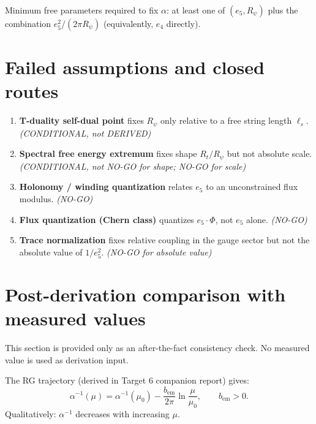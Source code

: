 \documentclass[11pt,a4paper]{article}
\begin{document}
Minimum free parameters required to fix $\alpha$: at least one of $(e_5, R_\psi)$
plus the combination $e_5^2/(2\pi R_\psi)$ (equivalently, $e_4$ directly).

\section{Failed assumptions and closed routes}

\begin{enumerate}
\item \textbf{T-duality self-dual point} fixes $R_\psi$ only relative to a
  free string length $\ell_s$. \emph{(CONDITIONAL, not DERIVED)}

\item \textbf{Spectral free energy extremum} fixes shape $R_t/R_\psi$ but not
  absolute scale. \emph{(CONDITIONAL, not NO-GO for shape; NO-GO for scale)}

\item \textbf{Holonomy / winding quantization} relates $e_5$ to an unconstrained
  flux modulus. \emph{(NO-GO)}

\item \textbf{Flux quantization (Chern class)} quantizes $e_5\cdot\Phi$, not
  $e_5$ alone. \emph{(NO-GO)}

\item \textbf{Trace normalization} fixes relative coupling in the gauge sector
  but not the absolute value of $1/e_5^2$. \emph{(NO-GO for absolute value)}
\end{enumerate}

\section{Post-derivation comparison with measured values}

This section is provided only as an after-the-fact consistency check.
No measured value is used as derivation input.

The RG trajectory (derived in Target 6 companion report) gives:
\begin{equation}
  \alpha^{-1}(\mu)=\alpha^{-1}(\mu_0)
  -\frac{b_\mathrm{em}}{2\pi}\ln\frac{\mu}{\mu_0},
  \qquad b_\mathrm{em}>0.
\end{equation}
Qualitatively: $\alpha^{-1}$ decreases with increasing $\mu$.
\end{document}
